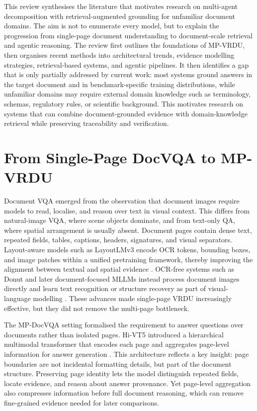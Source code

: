 \documentclass[10pt,a4paper]{article}
\begin{document}
This review synthesises the literature that motivates research on multi-agent decomposition with retrieval-augmented grounding for unfamiliar document domains. The aim is not to enumerate every model, but to explain the progression from single-page document understanding to document-scale retrieval and agentic reasoning. The review first outlines the foundations of MP-VRDU, then organises recent methods into architectural trends, evidence modelling strategies, retrieval-based systems, and agentic pipelines. It then identifies a gap that is only partially addressed by current work: most systems ground answers in the target document and in benchmark-specific training distributions, while unfamiliar domains may require external domain knowledge such as terminology, schemas, regulatory rules, or scientific background. This motivates research on systems that can combine document-grounded evidence with domain-knowledge retrieval while preserving traceability and verification.

\section{From Single-Page DocVQA to MP-VRDU}

Document VQA emerged from the observation that document images require models to read, localise, and reason over text in visual context. This differs from natural-image VQA, where scene objects dominate, and from text-only QA, where spatial arrangement is usually absent. Document pages contain dense text, repeated fields, tables, captions, headers, signatures, and visual separators. Layout-aware models such as LayoutLMv3 encode OCR tokens, bounding boxes, and image patches within a unified pretraining framework, thereby improving the alignment between textual and spatial evidence \cite{huang2022layoutlmv3}. OCR-free systems such as Donut and later document-focused MLLMs instead process document images directly and learn text recognition or structure recovery as part of visual-language modelling \cite{kim2021donut,hu2024mplug}. These advances made single-page VRDU increasingly effective, but they did not remove the multi-page bottleneck.

The MP-DocVQA setting formalised the requirement to answer questions over documents rather than isolated pages. Hi-VT5 introduced a hierarchical multimodal transformer that encodes each page and aggregates page-level information for answer generation \cite{tito2023hierarchical}. This architecture reflects a key insight: page boundaries are not incidental formatting details, but part of the document structure. Preserving page identity lets the model distinguish repeated fields, locate evidence, and reason about answer provenance. Yet page-level aggregation also compresses information before full document reasoning, which can remove fine-grained evidence needed for later comparisons.
\end{document}
